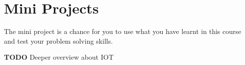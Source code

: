 \section{Mini Projects}
The mini project is a chance for you to use what you have learnt in this course and test your problem solving skills.

\textbf{TODO} Deeper overview about IOT






